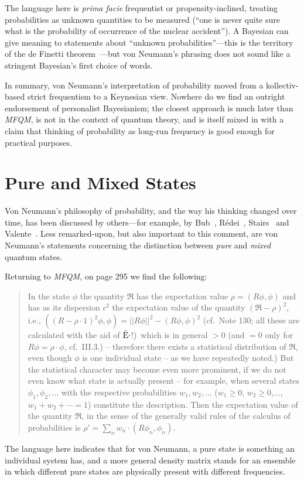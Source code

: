 \documentclass[aps,pra,superscriptaddress,12pt,tightenlines,nofootinbib]{revtex4}
\newcommand{\MFQM}{\textsl{MFQM}}
\begin{document}
The language here is \emph{prima facie} frequentist or
propensity-inclined, treating probabilities as unknown quantities to
be measured (``one is never quite sure what is the probability of
occurrence of the nuclear accident'').  A Bayesian can give meaning to
statements about ``unknown probabilities''---this is the territory of
the de Finetti theorem~\cite{CFS2001}---but von Neumann's phrasing does not
sound like a stringent Bayesian's first choice of words.

In summary, von Neumann's interpretation of probability moved from a
kollectiv-based strict frequentism to a Keynesian view.  Nowhere do we
find an outright endorsement of personalist Bayesianism; the closest
approach is much later than \MFQM, is not in the context of quantum
theory, and is itself mixed in with a claim that thinking of
probability as long-run frequency is good enough for practical
purposes.

\section{Pure and Mixed States}

Von Neumann's philosophy of probability, and the way his thinking
changed over time, has been discussed by others---for example, by
Bub~\cite{Bub1979}, R\'edei~\cite{Redei2001}, Stairs~\cite{Stairs1985}
and Valente~\cite{Valente2009}.  Less remarked-upon, but also
important to this comment, are von Neumann's statements concerning the
distinction between \emph{pure} and \emph{mixed} quantum states.

Returning to \MFQM, on page 295 we find the following:
\begin{quotation}
In the state $\phi$ the quantity $\mathfrak{R}$ has the expectation
value $\rho = (R\phi, \phi)$ and has as its dispersion $\epsilon^2$
the expectation value of the quantity $(\mathfrak{R} - \rho)^2$, i.e.,
$((R- \rho\cdot 1)^2\phi, \phi) = ||R\phi||^2 - (R\phi, \phi)^2$
(cf.\ Note 130; all these are calculated with the aid of $\bar{\rm
  E}\cdot$!)\ which is in general $> 0 $ (and $= 0$ only for $R\phi =
\rho\cdot\phi$, cf.\ III.3.) -- therefore there exists a statistical
distribution of $\mathfrak{R}$, even though $\phi$ is one individual
state -- as we have repeatedly noted.)  But the statistical character
may become even more prominent, if we do not even know what state is
actually present -- for example, when several states
$\phi_1,\phi_2,\ldots$ with the respective probabilities
$w_1,w_2,\ldots$ ($w_1\geq 0$, $w_2\geq 0$,$\ldots$, $w_1+w_2+\cdots =
1$) constitute the description.  Then the expectation value of the
quantity $\mathfrak{R}$, in the sense of the generally valid rules of
the calculus of probabilities is $\rho' = \sum_n
w_n\cdot(R\phi_n,\phi_n)$.
\end{quotation}
The language here indicates that for von Neumann, a pure state is
something an individual system has, and a more general density matrix
stands for an ensemble in which different pure states are physically
present with different frequencies.
\end{document}
